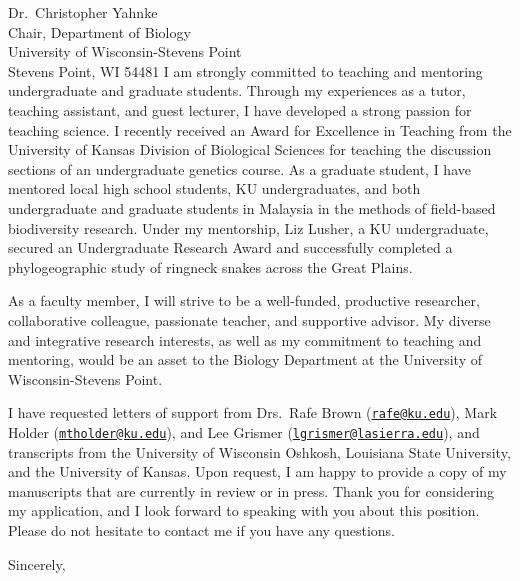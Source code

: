 \documentclass[letterpaper, 10pt]{letter}
\begin{document}
\begin{letter}{Dr.\ Christopher Yahnke \\
                     Chair, Department of Biology \\
                     University of Wisconsin-Stevens Point \\
                     Stevens Point, WI  54481}
I am strongly committed to teaching and mentoring undergraduate and graduate
students.
Through my experiences as a tutor, teaching assistant, and guest lecturer, I
have developed a strong passion for teaching science.
I recently received an Award for Excellence in Teaching from the University of
Kansas Division of Biological Sciences for teaching the discussion sections of
an undergraduate genetics course.
As a graduate student, I have mentored local high school students, KU
undergraduates, and both undergraduate and graduate students in Malaysia in the
methods of field-based biodiversity research.
Under my mentorship, Liz Lusher, a KU undergraduate, secured an Undergraduate
Research Award and successfully completed a phylogeographic study of ringneck
snakes across the Great Plains.

As a faculty member, I will strive to be a well-funded, productive researcher,
collaborative colleague, passionate teacher, and supportive advisor.
My diverse and integrative research interests, as well as my commitment to
teaching and mentoring, would be an asset to the Biology Department at the
University of Wisconsin-Stevens Point.

I have requested letters of support from Drs.\ Rafe Brown
(\href{mailto:rafe@ku.edu}{\tt rafe@ku.edu}), Mark Holder
(\href{mailto:mtholder@ku.edu}{\tt mtholder@ku.edu}), and Lee Grismer
(\href{mailto:lgrismer@lasierra.edu}{\tt lgrismer@lasierra.edu}), and
transcripts from the University of Wisconsin Oshkosh, Louisiana State
University, and the University of Kansas.
Upon request, I am happy to provide a copy of my manuscripts that are currently
in review or in press.
Thank you for considering my application, and I look forward to speaking with
you about this position.
Please do not hesitate to contact me if you have any questions.

\addtolength{\medskipamount}{-5pt}
\closing{Sincerely,}
\end{letter}
\end{document}
